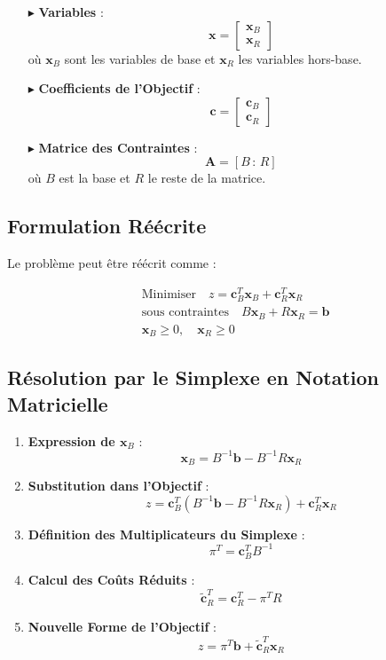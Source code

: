 \documentclass{report}
\begin{document}
\begin{multicols*}{2}
\begin{itemize}
    \item[$\blacktriangleright$] \textbf{Variables} :
    \[
    \mathbf{x} = 
    \begin{bmatrix}
    \mathbf{x}_B \\ \mathbf{x}_R
    \end{bmatrix}
    \]
    où \( \mathbf{x}_B \) sont les variables de base et \( \mathbf{x}_R \) les variables hors-base.
    \item[$\blacktriangleright$] \textbf{Coefficients de l'Objectif} :
    \[
    \mathbf{c} = 
    \begin{bmatrix}
    \mathbf{c}_B \\ \mathbf{c}_R
    \end{bmatrix}
    \]
    \item[$\blacktriangleright$] \textbf{Matrice des Contraintes} :
    \[
    \mathbf{A} = [ B \, : \, R ]
    \]
    où \( B \) est la base et \( R \) le reste de la matrice.
\end{itemize}

\subsection*{Formulation Réécrite}

Le problème peut être réécrit comme :

\begin{align*}
& \text{Minimiser} \quad z = \mathbf{c}_B^T \mathbf{x}_B + \mathbf{c}_R^T \mathbf{x}_R \\
& \text{sous contraintes} \quad B \mathbf{x}_B + R \mathbf{x}_R = \mathbf{b} \\
& \mathbf{x}_B \geq 0, \quad \mathbf{x}_R \geq 0
\end{align*}

\subsection*{Résolution par le Simplexe en Notation Matricielle}

\begin{enumerate}
    \item \textbf{Expression de \( \mathbf{x}_B \)} :
    \[
    \mathbf{x}_B = B^{-1} \mathbf{b} - B^{-1} R \mathbf{x}_R
    \]
    \item \textbf{Substitution dans l'Objectif} :
    \[
    z = \mathbf{c}_B^T ( B^{-1} \mathbf{b} - B^{-1} R \mathbf{x}_R ) + \mathbf{c}_R^T \mathbf{x}_R
    \]
    \item \textbf{Définition des Multiplicateurs du Simplexe} :
    \[
    \pi^T = \mathbf{c}_B^T B^{-1}
    \]
    \item \textbf{Calcul des Coûts Réduits} :
    \[
    \tilde{\mathbf{c}}_R^T = \mathbf{c}_R^T - \pi^T R
    \]
    \item \textbf{Nouvelle Forme de l'Objectif} :
    \[
    z = \pi^T \mathbf{b} + \tilde{\mathbf{c}}_R^T \mathbf{x}_R
    \]
\end{enumerate}


\end{multicols*}
\end{document}
